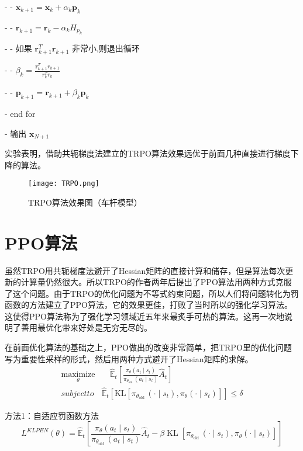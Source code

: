 - - $\boldsymbol{x}_{k+1}=\boldsymbol{x}_{k}+\alpha_{k} \boldsymbol{p}_{k}$

- - $\boldsymbol{r}_{k+1}=\boldsymbol{r}_{k}-\alpha_{k} H_{p_{k}}$

- - 如果 $\boldsymbol{r}_{k+1}^{T} \boldsymbol{r}_{k+1}$ 非常小,则退出循环

- - $\beta_{k}=\frac{\boldsymbol{r}_{k+1}^{T} r_{k+1}}{r_{k}^{T} r_{k}}$

- - $\boldsymbol{p}_{k+1}=\boldsymbol{r}_{k+1}+\beta_{k} \boldsymbol{p}_{k}$

- end for

- 输出 $\boldsymbol{x}_{N+1}$

实验表明，借助共轭梯度法建立的TRPO算法效果远优于前面几种直接进行梯度下降的算法。
\begin{figure}[hbt]
    \centering
    \texttt{[image: TRPO.png]}
	\vspace{-0.5cm}
    \caption{TRPO算法效果图（车杆模型）}
    \label{TRPO}
\end{figure}



\section{PPO算法}
虽然TRPO用共轭梯度法避开了Hessian矩阵的直接计算和储存，但是算法每次更新的计算量仍然很大。所以TRPO的作者两年后提出了PPO算法用两种方式克服了这个问题。由于TRPO的优化问题为不等式约束问题，所以人们将问题转化为罚函数的方法建立了PPO算法，它的效果更佳，打败了当时所以的强化学习算法。这使得PPO算法称为了强化学习领域近五年来最炙手可热的算法。这再一次地说明了善用最优化带来好处是无穷无尽的。

在前面优化算法的基础之上，PPO做出的改变非常简单，把TRPO里的优化问题写为重要性采样的形式，然后用两种方式避开了Hessian矩阵的求解。
$$\begin{aligned}
\underset{\theta}{\operatorname{maximize}}& \quad \hat{\mathbb{E}}_{t}\left[\frac{\pi_{\theta}\left(a_{t} \mid s_{t}\right)}{\pi_{\theta_{\text {old }}}\left(a_{t} \mid s_{t}\right)} \hat{A}_{t}\right]\\
subject to& \hat{\mathbb{E}}_{t}\left[\mathrm{KL}\left[\pi_{\theta_{\text {old }}}\left(\cdot \mid s_{t}\right), \pi_{\theta}\left(\cdot \mid s_{t}\right)\right]\right] \leq \delta
\end{aligned}$$

方法1：自适应罚函数方法
$$
L^{K L P E N}(\theta)=\hat{\mathbb{E}}_{t}\left[\frac{\pi_{\theta}\left(a_{t} \mid s_{t}\right)}{\pi_{\theta_{\text {old }}}\left(a_{t} \mid s_{t}\right)} \hat{A}_{t}-\beta \operatorname{KL}\left[\pi_{\theta_{\text {old }}}\left(\cdot \mid s_{t}\right), \pi_{\theta}\left(\cdot \mid s_{t}\right)\right]\right]
$$


